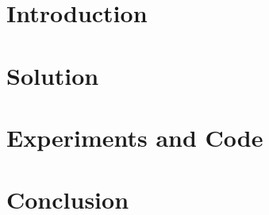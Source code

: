 \documentclass[11pt,a4paper]{report}
\begin{document}

\tableofcontents
\clearpage

\chapter{Introduction}


\chapter{Solution}


\chapter{Experiments and Code}


\chapter{Conclusion}

\printbibliography
% 
% 
\end{document}

